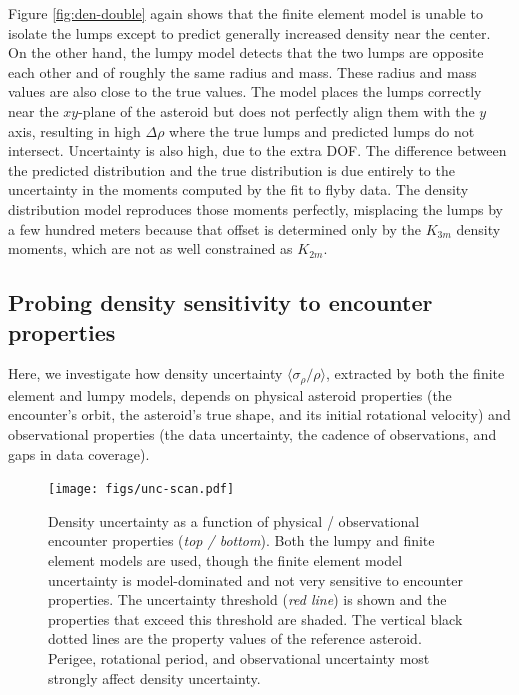 \documentclass[fleqn,usenatbib]{mnras}
\begin{document}
Figure \ref{fig:den-double} again shows that the finite element model is unable to isolate the lumps except to predict generally increased density near the center. On the other hand, the lumpy model detects that the two lumps are opposite each other and of roughly the same radius and mass. These radius and mass values are also close to the true values. The model places the lumps correctly near the $xy$-plane of the asteroid but does not perfectly align them with the $y$ axis, resulting in high $\Delta \rho$ where the true lumps and predicted lumps do not intersect. Uncertainty is also high, due to the extra DOF. The difference between the predicted distribution and the true distribution is due entirely to the uncertainty in the moments computed by the fit to flyby data. The density distribution model reproduces those moments perfectly, misplacing the lumps by a few hundred meters because that offset is determined only by the $K_{3m}$ density moments, which are not as well constrained as $K_{2m}$.



\subsection{Probing density sensitivity to encounter properties}
\label{sec:density-uncertainty}

Here, we investigate how density uncertainty $\langle \sigma_\rho / \rho \rangle$, extracted by both the finite element and lumpy models, depends on physical asteroid properties (the encounter's orbit, the asteroid's true shape, and its initial rotational velocity) and observational properties (the data uncertainty, the cadence of observations, and gaps in data coverage).

\begin{figure}
  \centering
  \texttt{[image: figs/unc-scan.pdf]}
  \caption{Density uncertainty as a function of physical / observational encounter properties (\textit{top / bottom}). Both the lumpy and finite element models are used, though the finite element model uncertainty is model-dominated and not very sensitive to encounter properties. The uncertainty threshold (\textit{red line}) is shown and the properties that exceed this threshold are shaded. The vertical black dotted lines are the property values of the reference asteroid. Perigee, rotational period, and observational uncertainty most strongly affect density uncertainty.}
  \label{fig:net-uncertainty}
\end{figure}
\end{document}
